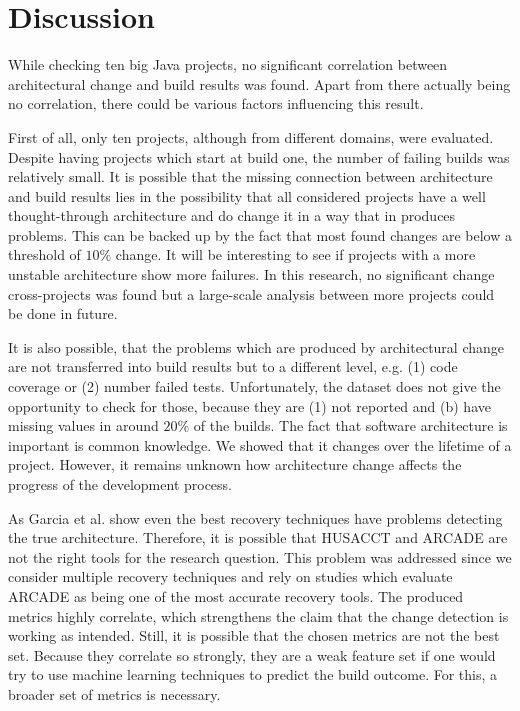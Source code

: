 \documentclass[sigplan, anonymous, review]{acmart}
\begin{document}
\section{Discussion}

While checking ten big Java projects, no significant correlation between architectural change and build results was found. Apart from there actually being no correlation, there could be various factors influencing this result. 

First of all, only ten projects, although from different domains, were evaluated. Despite having projects which start at build one, the number of failing builds was relatively small. It is possible that the missing connection between architecture and build results lies in the possibility that all considered projects have a well thought-through architecture and do change it in a way that in produces problems. This can be backed up by the fact that most found changes are below a threshold of $10\%$ change. It will be interesting to see if projects with a more unstable architecture show more failures. In this research, no significant change cross-projects was found but a large-scale analysis between more projects could be done in future. 

It is also possible, that the problems which are produced by architectural change are not transferred into build results but to a different level, e.g. (1) code coverage or (2) number failed tests. Unfortunately, the dataset does not give the opportunity to check for those, because they are (1) not reported and (b) have missing values in around $20\%$ of the builds. The fact that software architecture is important is common knowledge. We showed that it changes over the lifetime of a project. However, it remains unknown how architecture change affects the progress of the development process.

As Garcia et al. \cite{arcRec-comparison} show even the best recovery techniques have problems detecting the true architecture. Therefore, it is possible that HUSACCT and ARCADE are not the right tools for the research question. This problem was addressed since we consider multiple recovery techniques and rely on studies which evaluate ARCADE as being one of the most accurate recovery tools. The produced metrics highly correlate, which strengthens the claim that the change detection is working as intended. Still, it is possible that the chosen metrics are not the best set. Because they correlate so strongly, they are a weak feature set if one would try to use machine learning techniques to predict the build outcome. For this, a broader set of metrics is necessary. 
\end{document}
